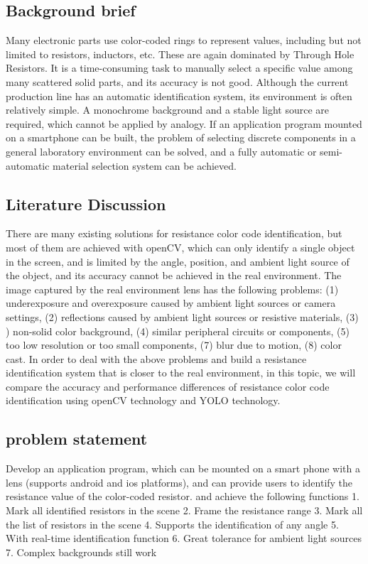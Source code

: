 \documentclass{article}
\begin{document}
\subsection{Background brief}
Many electronic parts use color-coded rings to represent values, including but not limited to resistors, inductors, etc. These are again dominated by Through Hole Resistors. It is a time-consuming task to manually select a specific value among many scattered solid parts, and its accuracy is not good. Although the current production line has an automatic identification system, its environment is often relatively simple. A monochrome background and a stable light source are required, which cannot be applied by analogy. If an application program mounted on a smartphone can be built, the problem of selecting discrete components in a general laboratory environment can be solved, and a fully automatic or semi-automatic material selection system can be achieved.

\subsection{Literature Discussion}
There are many existing solutions for resistance color code identification, but most of them are achieved with openCV, which can only identify a single object in the screen, and is limited by the angle, position, and ambient light source of the object, and its accuracy cannot be achieved in the real environment. The image captured by the real environment lens has the following problems: (1) underexposure and overexposure caused by ambient light sources or camera settings, (2) reflections caused by ambient light sources or resistive materials, (3) ) non-solid color background, (4) similar peripheral circuits or components, (5) too low resolution or too small components, (7) blur due to motion, (8) color cast.
In order to deal with the above problems and build a resistance identification system that is closer to the real environment, in this topic, we will compare the accuracy and performance differences of resistance color code identification using openCV technology and YOLO technology.

\subsection{problem statement}
Develop an application program, which can be mounted on a smart phone with a lens (supports android and ios platforms), and can provide users to identify the resistance value of the color-coded resistor. and achieve the following functions
1. Mark all identified resistors in the scene
2. Frame the resistance range
3. Mark all the list of resistors in the scene
4. Supports the identification of any angle
5. With real-time identification function
6. Great tolerance for ambient light sources
7. Complex backgrounds still work
\end{document}
